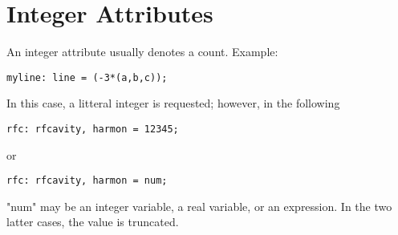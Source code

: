 
\section{Integer Attributes}
\label{sec:integer}

An integer attribute usually denotes a count. Example: 
\begin{verbatim}
myline: line = (-3*(a,b,c));
\end{verbatim} 

In this case, a litteral integer is requested; however, in the following 
\begin{verbatim}
rfc: rfcavity, harmon = 12345;
\end{verbatim} 

or 
\begin{verbatim}
rfc: rfcavity, harmon = num;
\end{verbatim} 

"num" may be an integer variable, a real variable, or an expression.  In
the two latter cases, the value is truncated. 


